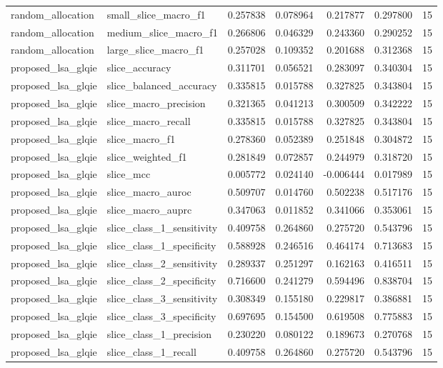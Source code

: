 \begin{tabular}{llrrrrr}
random_allocation & small_slice_macro_f1 & 0.257838 & 0.078964 & 0.217877 & 0.297800 & 15 \\
random_allocation & medium_slice_macro_f1 & 0.266806 & 0.046329 & 0.243360 & 0.290252 & 15 \\
random_allocation & large_slice_macro_f1 & 0.257028 & 0.109352 & 0.201688 & 0.312368 & 15 \\
proposed_lsa_glqie & slice_accuracy & 0.311701 & 0.056521 & 0.283097 & 0.340304 & 15 \\
proposed_lsa_glqie & slice_balanced_accuracy & 0.335815 & 0.015788 & 0.327825 & 0.343804 & 15 \\
proposed_lsa_glqie & slice_macro_precision & 0.321365 & 0.041213 & 0.300509 & 0.342222 & 15 \\
proposed_lsa_glqie & slice_macro_recall & 0.335815 & 0.015788 & 0.327825 & 0.343804 & 15 \\
proposed_lsa_glqie & slice_macro_f1 & 0.278360 & 0.052389 & 0.251848 & 0.304872 & 15 \\
proposed_lsa_glqie & slice_weighted_f1 & 0.281849 & 0.072857 & 0.244979 & 0.318720 & 15 \\
proposed_lsa_glqie & slice_mcc & 0.005772 & 0.024140 & -0.006444 & 0.017989 & 15 \\
proposed_lsa_glqie & slice_macro_auroc & 0.509707 & 0.014760 & 0.502238 & 0.517176 & 15 \\
proposed_lsa_glqie & slice_macro_auprc & 0.347063 & 0.011852 & 0.341066 & 0.353061 & 15 \\
proposed_lsa_glqie & slice_class_1_sensitivity & 0.409758 & 0.264860 & 0.275720 & 0.543796 & 15 \\
proposed_lsa_glqie & slice_class_1_specificity & 0.588928 & 0.246516 & 0.464174 & 0.713683 & 15 \\
proposed_lsa_glqie & slice_class_2_sensitivity & 0.289337 & 0.251297 & 0.162163 & 0.416511 & 15 \\
proposed_lsa_glqie & slice_class_2_specificity & 0.716600 & 0.241279 & 0.594496 & 0.838704 & 15 \\
proposed_lsa_glqie & slice_class_3_sensitivity & 0.308349 & 0.155180 & 0.229817 & 0.386881 & 15 \\
proposed_lsa_glqie & slice_class_3_specificity & 0.697695 & 0.154500 & 0.619508 & 0.775883 & 15 \\
proposed_lsa_glqie & slice_class_1_precision & 0.230220 & 0.080122 & 0.189673 & 0.270768 & 15 \\
proposed_lsa_glqie & slice_class_1_recall & 0.409758 & 0.264860 & 0.275720 & 0.543796 & 15 \\

\end{tabular}
